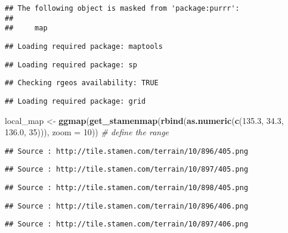 \documentclass[
  xelatex,ja=standard]{bxjsarticle}
\newenvironment{Shaded}{\begin{snugshade}}{\end{snugshade}}
\newcommand{\CommentTok}[1]{\textcolor[rgb]{0.56,0.35,0.01}{\textit{#1}}}
\newcommand{\DataTypeTok}[1]{\textcolor[rgb]{0.13,0.29,0.53}{#1}}
\newcommand{\DecValTok}[1]{\textcolor[rgb]{0.00,0.00,0.81}{#1}}
\newcommand{\FloatTok}[1]{\textcolor[rgb]{0.00,0.00,0.81}{#1}}
\newcommand{\KeywordTok}[1]{\textcolor[rgb]{0.13,0.29,0.53}{\textbf{#1}}}
\newcommand{\NormalTok}[1]{#1}
\newcommand{\StringTok}[1]{\textcolor[rgb]{0.31,0.60,0.02}{#1}}
\begin{document}
\begin{verbatim}
## The following object is masked from 'package:purrr':
## 
##     map
\end{verbatim}

\begin{verbatim}
## Loading required package: maptools
\end{verbatim}

\begin{verbatim}
## Loading required package: sp
\end{verbatim}

\begin{verbatim}
## Checking rgeos availability: TRUE
\end{verbatim}

\begin{verbatim}
## Loading required package: grid
\end{verbatim}

\begin{Shaded}
\begin{Highlighting}[]
\NormalTok{local_map <-}\StringTok{ }\KeywordTok{ggmap}\NormalTok{(}\KeywordTok{get_stamenmap}\NormalTok{(}\KeywordTok{rbind}\NormalTok{(}\KeywordTok{as.numeric}\NormalTok{(}\KeywordTok{c}\NormalTok{(}\FloatTok{135.3}\NormalTok{, }\FloatTok{34.3}\NormalTok{,}
                                                    \FloatTok{136.0}\NormalTok{, }\DecValTok{35}\NormalTok{))), }\DataTypeTok{zoom =} \DecValTok{10}\NormalTok{)) }\CommentTok{# define the range}
\end{Highlighting}
\end{Shaded}

\begin{verbatim}
## Source : http://tile.stamen.com/terrain/10/896/405.png
\end{verbatim}

\begin{verbatim}
## Source : http://tile.stamen.com/terrain/10/897/405.png
\end{verbatim}

\begin{verbatim}
## Source : http://tile.stamen.com/terrain/10/898/405.png
\end{verbatim}

\begin{verbatim}
## Source : http://tile.stamen.com/terrain/10/896/406.png
\end{verbatim}

\begin{verbatim}
## Source : http://tile.stamen.com/terrain/10/897/406.png
\end{verbatim}
\end{document}
